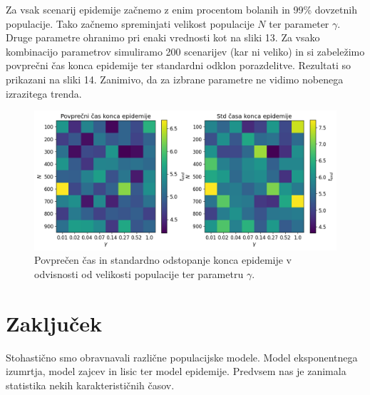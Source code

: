 \documentclass[slovene,11pt,a4paper]{article}
\begin{document}
Za vsak scenarij epidemije začnemo z enim procentom bolanih in 99\% dovzetnih populacije. Tako začnemo spreminjati velikost populacije $N$ ter parameter $\gamma$. Druge parametre ohranimo pri enaki vrednosti kot na sliki 13. Za vsako kombinacijo parametrov simuliramo 200 scenarijev (kar ni veliko) in si zabeležimo povprečni čas konca epidemije ter standardni odklon porazdelitve. Rezultati so prikazani na sliki 14. Zanimivo, da za izbrane parametre ne vidimo nobenega izrazitega trenda.

\begin{figure}[h!]
\centering
\includegraphics[width=16cm]{slika14.png}
\caption{Povprečen čas in standardno odstopanje konca epidemije v odvisnosti od velikosti populacije ter parametru $\gamma$.}
\end{figure}

\section{Zaključek}

Stohastično smo obravnavali različne populacijske modele. Model eksponentnega izumrtja, model zajcev in lisic ter model epidemije. Predvsem nas je zanimala statistika nekih karakterističnih časov.
\end{document}
